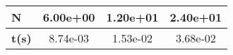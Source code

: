\begin{tiny}\begin{tabular}{|l|c|c|c|}
\hline
\textbf{N}&6.00e+00&1.20e+01&2.40e+01\\\hline
\textbf{t(s)}&8.74e-03&1.53e-02&3.68e-02\\\hline
\end{tabular}
\end{tiny}